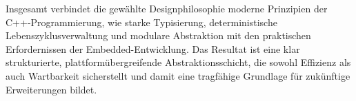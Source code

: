 Insgesamt verbindet die gewählte Designphilosophie moderne Prinzipien der C++-Programmierung, wie starke Typisierung, deterministische Lebenszyklusverwaltung und modulare Abstraktion mit den praktischen Erfordernissen der Embedded-Entwicklung. 
Das Resultat ist eine klar strukturierte, plattformübergreifende Abstraktionsschicht, die sowohl Effizienz als auch Wartbarkeit sicherstellt und damit eine tragfähige Grundlage für zukünftige Erweiterungen bildet.



































